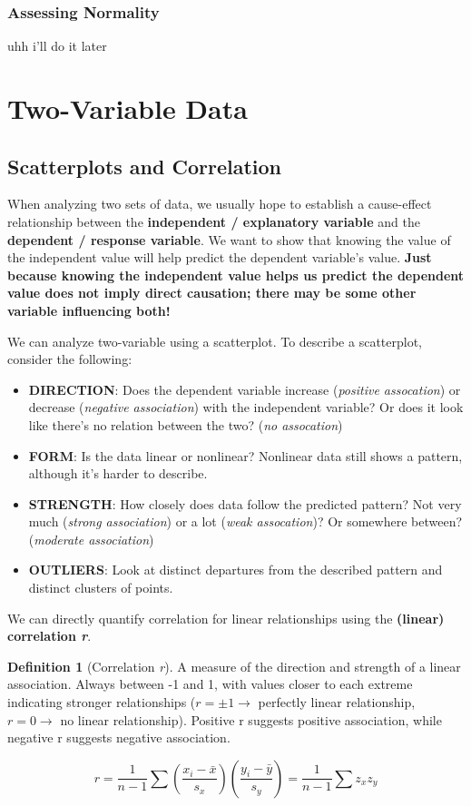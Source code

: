 \documentclass[12pt, a4paper]{article}
\theoremstyle{definition}
\newtheorem{definition}{Definition}
\begin{document}
\subsubsection{Assessing Normality}
uhh i'll do it later

\newpage

\section{Two-Variable Data}
\subsection{Scatterplots and Correlation}

When analyzing two sets of data, we usually hope to establish a cause-effect relationship between the \textbf{independent / explanatory variable} and the \textbf{dependent / response variable}.
We want to show that knowing the value of the independent value will help predict the dependent variable's value.
\textbf{Just because knowing the independent value helps us predict the dependent value does not imply direct causation; there may be some other variable influencing both!}

We can analyze two-variable using a scatterplot. To describe a scatterplot, consider the following:
\begin{itemize}
    \item \textbf{DIRECTION}: Does the dependent variable increase (\textit{positive assocation}) or decrease (\textit{negative association}) with the independent variable?
    Or does it look like there's no relation between the two? (\textit{no assocation})
    \item \textbf{FORM}: Is the data linear or nonlinear? Nonlinear data still shows a pattern, although it's harder to describe.
    \item \textbf{STRENGTH}: How closely does data follow the predicted pattern? Not very much (\textit{strong association}) or a lot (\textit{weak assocation})? Or somewhere between? (\textit{moderate association})
    \item \textbf{OUTLIERS}: Look at distinct departures from the described pattern and distinct clusters of points.
\end{itemize}

We can directly quantify correlation for linear relationships using the \textbf{(linear) correlation \textit{r}}.

\begin{definition}[Correlation \textit{r}]
    A measure of the direction and strength of a linear association.
    Always between -1 and 1, with values closer to each extreme indicating stronger relationships ($r = \pm 1 \rightarrow$ perfectly linear relationship, $r = 0 \rightarrow$ no linear relationship).
    Positive r suggests positive association, while negative r suggests negative association.

    \[r = \frac{1}{n - 1} \sum (\frac{x_i - \bar{x}}{s_x})(\frac{y_i - \bar{y}}{s_y}) = \frac{1}{n-1} \sum z_x z_y\]
\end{definition}
\end{document}
